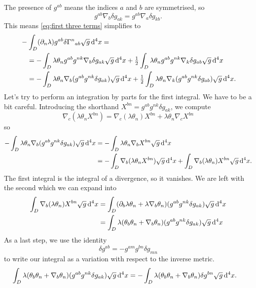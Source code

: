 \documentclass[../main.tex]{subfiles}
\begin{document}
The presence of \( g^{ab} \) means the indices \( a \) and \( b \) are symmetrised, so
\begin{equation*}
	g^{ab} \nabla_b \delta g_{ak} = g^{ab} \nabla_a \delta g_{kb}. 
\end{equation*}
This means \cref{eq:first three terms} simplifies to
\begin{align}
	&	-\int_D (\partial_n \lambda) g^{ab} \delta{\Gamma^n}_{ab} \sqrt{g} \,\mathrm{d}^4 x = \notag \\
	& \quad = - \int_D \lambda \theta_n g^{ab}g^{nk} \nabla_b \delta g_{ak} \sqrt{g} \,\mathrm{d}^4 x
	+ \tfrac{1}{2} \int_D \lambda \theta_n g^{ab}g^{nk} \nabla_k \delta g_{ab} \sqrt{g}
	\,\mathrm{d}^4 x \notag \\
	& \quad = - \int_D \lambda \theta_n \nabla_b (g^{ab}g^{nk} \delta g_{ak}) \sqrt{g} \,\mathrm{d}^4 x
	+ \tfrac{1}{2} \int_D \lambda \theta_n \nabla_k (g^{ab}g^{nk}\delta g_{ab}) \sqrt{g}
	\,\mathrm{d}^4 x. \label{eq:two integrals}
\end{align}
Let's try to perform an integration by parts for the first integral. We have to be a bit
careful. Introducing the shorthand \( X^{bn} = g^{ab}g^{nk}\delta g_{ak} \), we compute
\begin{equation*}
	\nabla_c(\lambda\theta_n X^{bn}) = \nabla_c(\lambda \theta_n)X^{bn} + \lambda \theta_n
	\nabla_c X^{bn}
\end{equation*}
so
\begin{align*}
	-\int_D \lambda \theta_n \nabla_b (g^{ab}g^{nk} \delta g_{ak})\sqrt{g}\,\mathrm{d}^4x 
	& = - \int_D \lambda \theta_n \nabla_bX^{bn} \sqrt{g} \,\mathrm{d}^4 x \\
	& = - \int_D \nabla_b(\lambda \theta_n X^{bn})\sqrt{g}\,\mathrm{d}^4x + \int_{D}
	\nabla_b(\lambda\theta_n)X^{bn}\sqrt{g}\,\mathrm{d}^4x. 
\end{align*}
The first integral is the integral of a divergence, so it vanishes. We are left with the
second which we can expand into
\begin{align*}
	\int_D \nabla_b(\lambda \theta_n) X^{bn}\sqrt{g}\,\mathrm{d}^4 x 
	& = \int_D (\partial_b \lambda \theta_n + \lambda \nabla_b\theta_n)(g^{ab}g^{nk}\delta
	g_{ak})\sqrt{g} \,\mathrm{d}^4 x \\
	& = \int_D \lambda(\theta_b\theta_n +
	\nabla_b\theta_n)(g^{ab}g^{nk}\delta g_{ak})\sqrt{g}\,\mathrm{d}^4 x
\end{align*}
As a last step, we use the identity
\begin{equation*}
	\delta g^{ab} = - g^{am}g^{bn} \delta g_{mn}
\end{equation*}
to write our integral as a variation with respect to the inverse metric.
\begin{align*}
	\int_D \lambda(\theta_b\theta_n + \nabla_b\theta_n)(g^{ab}g^{nk}\delta
	g_{ak})\sqrt{g}\,\mathrm{d}^4 x 
	& = -\int_D \lambda(\theta_b\theta_n + \nabla_b \theta_n)\delta g^{bn} \sqrt{g} \,\mathrm{d}^4 x. 
\end{align*}
\end{document}
